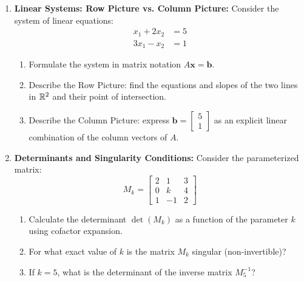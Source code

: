 \begin{enumerate}
    \item \textbf{Linear Systems: Row Picture vs. Column Picture:}
    Consider the system of linear equations:
    \begin{align*}
    x_1 + 2x_2 &= 5 \\
    3x_1 - x_2 &= 1
    \end{align*}
    \begin{enumerate}
        \item Formulate the system in matrix notation $A\mathbf{x} = \mathbf{b}$.
        \item Describe the Row Picture: find the equations and slopes of the two lines in $\mathbb{R}^2$ and their point of intersection.
        \item Describe the Column Picture: express $\mathbf{b} = \begin{bmatrix} 5 \\ 1 \end{bmatrix}$ as an explicit linear combination of the column vectors of $A$.
    \end{enumerate}

    \item \textbf{Determinants and Singularity Conditions:}
    Consider the parameterized matrix:
    \begin{equation}
    M_k = \begin{bmatrix} 2 & 1 & 3 \\ 0 & k & 4 \\ 1 & -1 & 2 \end{bmatrix}
    \end{equation}
    \begin{enumerate}
        \item Calculate the determinant $\det(M_k)$ as a function of the parameter $k$ using cofactor expansion.
        \item For what exact value of $k$ is the matrix $M_k$ singular (non-invertible)?
        \item If $k = 5$, what is the determinant of the inverse matrix $M_5^{-1}$?
    \end{enumerate}


\end{enumerate}
